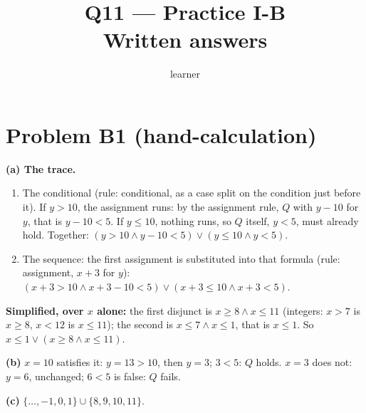 \documentclass[11pt]{article}
\title{Q11 --- Practice I-B \\ \large Written answers}
\author{learner}
\date{}
\begin{document}
\maketitle
\sloppy

\section*{Problem B1 (hand-calculation)}\label{ans:B1}
\begin{answer}
\textbf{(a) The trace.}
\begin{enumerate}
\item The conditional (rule: conditional, as a case split on the condition
  just before it). If $y > 10$, the assignment runs: by the assignment rule,
  $Q$ with $y - 10$ for $y$, that is $y - 10 < 5$. If $y \le 10$, nothing
  runs, so $Q$ itself, $y < 5$, must already hold. Together:
  $(y > 10 \wedge y - 10 < 5) \vee (y \le 10 \wedge y < 5)$.
\item The sequence: the first assignment is substituted into that formula
  (rule: assignment, $x + 3$ for $y$):
  $(x + 3 > 10 \wedge x + 3 - 10 < 5) \vee (x + 3 \le 10 \wedge x + 3 < 5)$.
\end{enumerate}
\textbf{Simplified, over $x$ alone:} the first disjunct is $x \ge 8 \wedge
x \le 11$ (integers: $x > 7$ is $x \ge 8$, $x < 12$ is $x \le 11$); the
second is $x \le 7 \wedge x \le 1$, that is $x \le 1$. So $x \le 1 \vee
(x \ge 8 \wedge x \le 11)$.

\textbf{(b)} $x = 10$ satisfies it: $y = 13 > 10$, then $y = 3$; $3 < 5$:
$Q$ holds. $x = 3$ does not: $y = 6$, unchanged; $6 < 5$ is false: $Q$
fails.

\textbf{(c)} $\{\dots, -1, 0, 1\} \cup \{8, 9, 10, 11\}$.
\end{answer}

\end{document}
